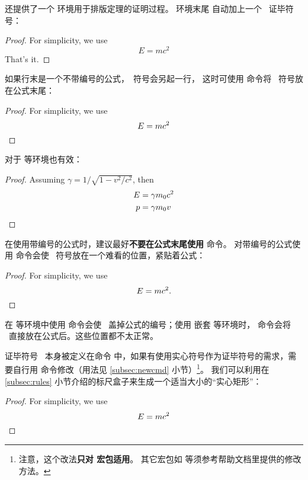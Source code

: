  还提供了一个  环境用于排版定理的证明过程。 环境末尾
自动加上一个 \qedsymbol\ 证毕符号：
\begin{example}
\begin{proof}
For simplicity, we use
\[
E=mc^2
\]
That's it.
\end{proof}
\end{example}

如果行末是一个不带编号的公式，\qedsymbol\ 符号会另起一行，
这时可使用  命令将 \qedsymbol\ 符号放在公式末尾：
\begin{example}
\begin{proof}
For simplicity, we use
\[
E=mc^2 \qedhere
\]
\end{proof}
\end{example}

 对于  等环境也有效：
\begin{example}
\begin{proof}
Assuming $\gamma 
= 1/\sqrt{1-v^2/c^2}$, then
\begin{align*}
E &= \gamma m_0 c^2  \\
p &= \gamma m_0v \qedhere
\end{align*}
\end{proof}
\end{example}

在使用带编号的公式时，建议最好\textbf{不要在公式末尾使用}  命令。
对带编号的公式使用  命令会使 \qedsymbol\ 符号放在一个难看的位置，紧贴着公式：
\begin{example}
\begin{proof}
For simplicity, we use
\begin{equation}
E=mc^2.\qedhere
\end{equation}
\end{proof}
\end{example}

在  等环境中使用  命令会使 \qedsymbol\ 盖掉公式的编号；使用  嵌套
 等环境时， 命令会将 \qedsymbol\ 直接放在公式后。这些位置都不太正常。

证毕符号 \qedsymbol\ 本身被定义在命令  中，如果有使用实心符号作为证毕符号的需求，需要自行用 
命令修改（用法见 \ref{subsec:newcmd} 小节）\footnote{注意，这个改法\textbf{只对  宏包适用}。
其它宏包如  等须参考帮助文档里提供的修改方法。}。
我们可以利用在 \ref{subsec:rules} 小节介绍的标尺盒子来生成一个适当大小的“实心矩形”：
\begin{example}
\renewcommand{\qedsymbol}%
  {\rule{1ex}{1.5ex}}
\begin{proof}
For simplicity, we use
\[
E=mc^2 \qedhere
\]
\end{proof}
\end{example}

\endinput
